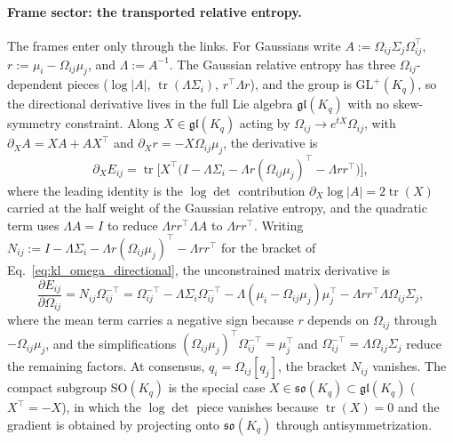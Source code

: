 \paragraph{Frame sector: the transported relative entropy.}
The frames enter only through the links. For Gaussians write $A := \Omega_{ij}\Sigma_j\Omega_{ij}^\top$, $r := \mu_i - \Omega_{ij}\mu_j$, and $\Lambda := A^{-1}$. The Gaussian relative entropy has three $\Omega_{ij}$-dependent pieces ($\log|A|$, $\operatorname{tr}(\Lambda\Sigma_i)$, $r^\top\Lambda r$), and the group is $\mathrm{GL}^+(K_q)$, so the directional derivative lives in the full Lie algebra $\mathfrak{gl}(K_q)$ with no skew-symmetry constraint. Along $X \in \mathfrak{gl}(K_q)$ acting by $\Omega_{ij} \to e^{tX}\Omega_{ij}$, with $\partial_X A = XA + AX^\top$ and $\partial_X r = -X\Omega_{ij}\mu_j$, the derivative is
\begin{equation}
\partial_X E_{ij} = \operatorname{tr}\Big[X^\top\Big(I - \Lambda\Sigma_i - \Lambda r(\Omega_{ij}\mu_j)^\top - \Lambda r r^\top\Big)\Big],
\label{eq:kl_omega_directional}
\end{equation}
where the leading identity is the $\log\det$ contribution $\partial_X\log|A| = 2\operatorname{tr}(X)$ carried at the half weight of the Gaussian relative entropy, and the quadratic term uses $\Lambda A = I$ to reduce $\Lambda r r^\top\Lambda A$ to $\Lambda r r^\top$. Writing $N_{ij} := I - \Lambda\Sigma_i - \Lambda r(\Omega_{ij}\mu_j)^\top - \Lambda r r^\top$ for the bracket of Eq.~\eqref{eq:kl_omega_directional}, the unconstrained matrix derivative is
\begin{equation}
\frac{\partial E_{ij}}{\partial \Omega_{ij}} = N_{ij}\Omega_{ij}^{-\top} = \Omega_{ij}^{-\top} - \Lambda \Sigma_i \Omega_{ij}^{-\top} - \Lambda(\mu_i - \Omega_{ij}\mu_j)\mu_j^\top - \Lambda r r^\top \Lambda \Omega_{ij}\Sigma_j,
\label{eq:kl_omega_unconstrained}
\end{equation}
where the mean term carries a negative sign because $r$ depends on $\Omega_{ij}$ through $-\Omega_{ij}\mu_j$, and the simplifications $(\Omega_{ij}\mu_j)^\top\Omega_{ij}^{-\top} = \mu_j^\top$ and $\Omega_{ij}^{-\top} = \Lambda\Omega_{ij}\Sigma_j$ reduce the remaining factors. At consensus, $q_i = \Omega_{ij}[q_j]$, the bracket $N_{ij}$ vanishes. The compact subgroup $\mathrm{SO}(K_q)$ is the special case $X \in \mathfrak{so}(K_q) \subset \mathfrak{gl}(K_q)$ ($X^\top = -X$), in which the $\log\det$ piece vanishes because $\operatorname{tr}(X) = 0$ and the gradient is obtained by projecting onto $\mathfrak{so}(K_q)$ through antisymmetrization.

